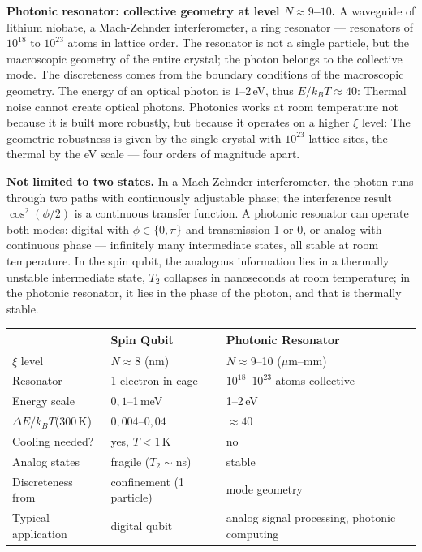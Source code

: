 \textbf{Photonic resonator: collective geometry at level
$N\approx9$--$10$.} A waveguide of lithium niobate, a
Mach-Zehnder interferometer, a ring resonator --- resonators of
$10^{18}$ to $10^{23}$ atoms in lattice order. The resonator is not
a single particle, but the macroscopic geometry of the entire
crystal; the photon belongs to the collective mode. The discreteness comes
from the boundary conditions of the macroscopic geometry. The energy of an
optical photon is $1$--$2$\,eV, thus $E/k_BT\approx40$: Thermal
noise cannot create optical photons. Photonics works
at room temperature not because it is built more robustly, but because
it operates on a higher $\xi$ level: The geometric robustness
is given by the single crystal with $10^{23}$ lattice sites, the thermal by the eV scale --- four orders of magnitude apart.

\textbf{Not limited to two states.} In a Mach-Zehnder
interferometer, the photon runs through two paths with continuously
adjustable phase; the interference result $\cos^2(\phi/2)$ is a
continuous transfer function. A photonic resonator can operate both modes:
digital with $\phi\in\{0,\pi\}$ and transmission
1 or 0, or analog with continuous phase --- infinitely many
intermediate states, all stable at room temperature. In the spin qubit,
the analogous information lies in a thermally unstable intermediate state,
$T_2$ collapses in nanoseconds at room temperature; in the
photonic resonator, it lies in the phase of the photon, and that is
thermally stable.

\begin{center}
\small\renewcommand{\arraystretch}{1.3}
\begin{tabular}{p{2.6cm}p{2.8cm}p{3cm}}
\toprule
 & \textbf{Spin Qubit} & \textbf{Photonic Resonator} \\
\midrule
$\xi$ level & $N\approx8$ (nm) & $N\approx9$--10 ($\mu$m--mm) \\
Resonator & 1 electron in cage & $10^{18}$--$10^{23}$ atoms collective \\
Energy scale & $0{,}1$--1\,meV & 1--2\,eV \\
$\Delta E/k_BT$(300\,K) & $0{,}004$--$0{,}04$ & $\approx40$ \\
Cooling needed? & yes, $T<1$\,K & no \\
Analog states & fragile ($T_2\sim$ns) & stable \\
Discreteness from & confinement (1 particle) & mode geometry \\
Typical application & digital qubit & analog signal processing, photonic computing \\
\bottomrule
\end{tabular}
\end{center}

